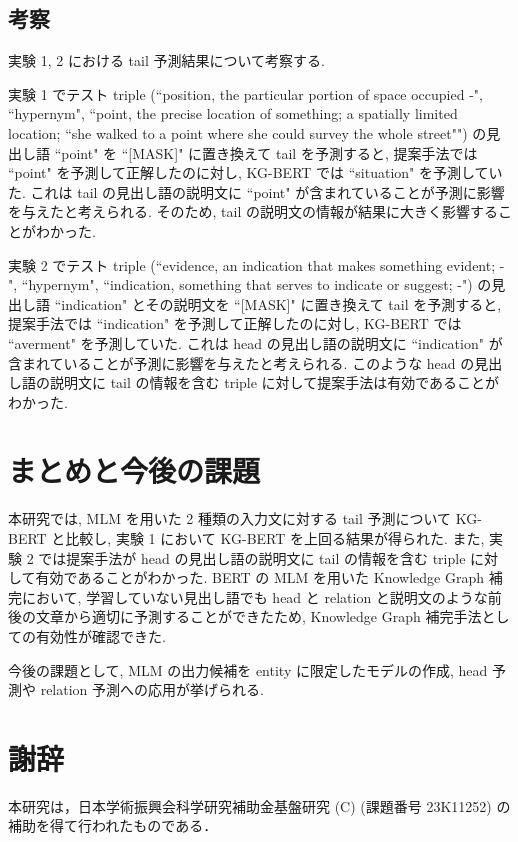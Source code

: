 \documentclass[twocolumn]{jarticle}
\begin{document}
\subsection{考察}

実験 1, 2 における tail 予測結果について考察する. \par
実験 1 でテスト triple (``position, the particular portion of space occupied -", ``hypernym", ``point, the precise location of something; a spatially limited location; ``she walked to a point where she could survey the whole street"") の見出し語 ``point" を ``[MASK]" に置き換えて tail を予測すると, 提案手法では ``point" を予測して正解したのに対し, KG-BERT では ``situation" を予測していた. これは tail の見出し語の説明文に ``point" が含まれていることが予測に影響を与えたと考えられる. そのため, tail の説明文の情報が結果に大きく影響することがわかった. \par
実験 2 でテスト triple (``evidence, an indication that makes something evident; -", ``hypernym", ``indication, something that serves to indicate or suggest; -") の見出し語 ``indication" とその説明文を ``[MASK]" に置き換えて tail を予測すると, 提案手法では ``indication" を予測して正解したのに対し, KG-BERT では ``averment" を予測していた. これは head の見出し語の説明文に ``indication" が含まれていることが予測に影響を与えたと考えられる. このような head の見出し語の説明文に tail の情報を含む triple に対して提案手法は有効であることがわかった.\par

\vspace{-1mm}
\section{まとめと今後の課題}
本研究では, MLM を用いた 2 種類の入力文に対する tail 予測について KG-BERT と比較し, 実験 1 において KG-BERT を上回る結果が得られた. また, 実験 2 では提案手法が head の見出し語の説明文に tail の情報を含む triple に対して有効であることがわかった. BERT の MLM を用いた Knowledge Graph 補完において, 学習していない見出し語でも head と relation と説明文のような前後の文章から適切に予測することができたため, Knowledge Graph 補完手法としての有効性が確認できた. \par
今後の課題として, MLM の出力候補を entity に限定したモデルの作成, head 予測や relation 予測への応用が挙げられる. \par

\section*{謝辞}
本研究は，日本学術振興会科学研究補助金基盤研究 (C) (課題番号 23K11252) の補助を得て行われたものである．



\end{document}
